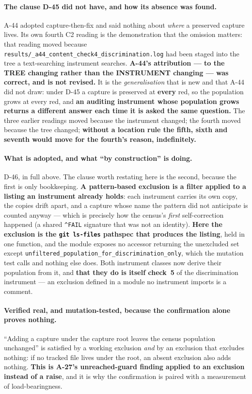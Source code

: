 \documentclass[
  10pt,
]{article}
\begin{document}
\paragraph{The clause D-45 did not have, and how its absence was found.}
A-44 adopted capture-then-fix and said nothing about \emph{where} a preserved capture lives. Its own fourth C2 reading is the demonstration that the omission matters: that reading moved because \texttt{results/\allowbreak{}\_a44\_content\_check4\_discrimination.log} had been staged into the tree a text-searching instrument searches. \textbf{A-44's attribution --- to the TREE changing rather than the INSTRUMENT changing --- was correct, and is not revised.} It is the \emph{generalisation} that is new and that A-44 did not draw: under D-45 a capture is preserved at \textbf{every} red, so the population grows at every red, and \textbf{an auditing instrument whose population grows returns a different answer each time it is asked the same question.} The three earlier readings moved because the instrument changed; the fourth moved because the tree changed; \textbf{without a location rule the fifth, sixth and seventh would move for the fourth's reason, indefinitely.}

\paragraph{What is adopted, and what ``by construction'' is doing.}
D-46, in full above. The clause worth restating here is the second, because the first is only bookkeeping. \textbf{A pattern-based exclusion is a filter applied to a listing an instrument already holds}: each instrument carries its own copy, the copies drift apart, and a capture whose name the pattern did not anticipate is counted anyway --- which is precisely how the census's \emph{first} self-correction happened (a shared \texttt{\^{}FAIL} signature that was not an identity). \textbf{Here the exclusion is the \texttt{git ls-files} pathspec that produces the listing}, held in one function, and the module exposes no accessor returning the unexcluded set except \texttt{unfiltered\_population\_\allowbreak{}for\_discrimination\_only}, which the mutation test calls and nothing else does. Both instrument classes now derive their population from it, and \textbf{that they do is itself check~5} of the discrimination instrument --- an exclusion defined in a module no instrument imports is a comment.

\paragraph{Verified real, and mutation-tested, because the confirmation alone proves nothing.}
``Adding a capture under the capture root leaves the census population unchanged'' is satisfied by a working exclusion \emph{and} by an exclusion that excludes nothing: if no tracked file lives under the root, an absent exclusion also adds nothing. \textbf{This is A-27's unreached-guard finding applied to an exclusion instead of a raise}, and it is why the confirmation is paired with a measurement of load-bearingness.
\end{document}
